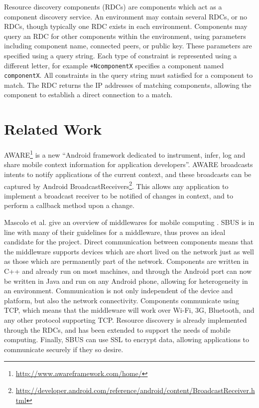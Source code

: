 \documentclass[12pt,twoside,notitlepage]{report}
\begin{document}
Resource discovery components (RDCs) are components which act as a component discovery service. 
An environment may contain several RDCs, or no RDCs, though typically one RDC exists in each environment.
Components may query an RDC for other components within the environment, using parameters including component name, connected peers, or public key. 
These parameters are specified using a query string. 
Each type of constraint is represented using a different letter, for example {\tt +NcomponentX} specifies a component named {\tt componentX}. 
All constraints in the query string must satisfied for a component to match. 
The RDC returns the IP addresses of matching components, allowing the component to establish a direct connection to a match.

\section{Related Work}

AWARE\footnote{\url{http://www.awareframework.com/home/}} is a new ``Android framework dedicated to instrument, infer, log and share mobile context information for application developers''. 
AWARE broadcasts intents to notify applications of the current context, and these broadcasts can be captured by Android BroadcastReceivers\footnote{\url{http://developer.android.com/reference/android/content/BroadcastReceiver.html}}. 
This allows any application to implement a broadcast receiver to be notified of changes in context, and to perform a callback method upon a change. 

Mascolo et al. give an overview of middlewares for mobile computing \cite{mascolo2002mobile}. 
SBUS is in line with many of their guidelines for a middleware, thus proves an ideal candidate for the project. 
Direct communication between components means that the middleware supports devices which are short lived on the network just as well as those which are permanently part of the network. 
Components are written in C++ and already run on most machines, and through the Android port can now be written in Java and run on any Android phone, allowing for heterogeneity in an environment. 
Communication is not only independent of the device and platform, but also the network connectivity. 
Components communicate using TCP, which means that the middleware will work over Wi-Fi, 3G, Bluetooth, and any other protocol supporting TCP. 
Resource discovery is already implemented through the RDCs, and has been extended to support the needs of mobile computing. 
Finally, SBUS can use SSL to encrypt data, allowing applications to communicate securely if they so desire. 
\end{document}
